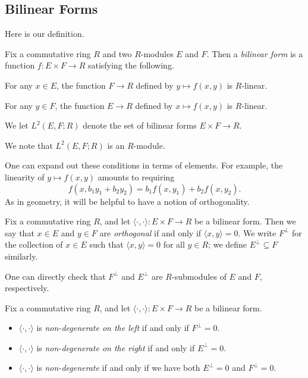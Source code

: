 \documentclass[../notes.tex]{subfiles}
\begin{document}
\subsection{Bilinear Forms}
Here is our definition.
\begin{definition}[bilinear]
	Fix a commutative ring $R$ and two $R$-modules $E$ and $F$. Then a \textit{bilinear form} is a function $f\colon E\times F\to R$ satisfying the following.
	\begin{listalph}
		\item For any $x\in E$, the function $F\to R$ defined by $y\mapsto f(x,y)$ is $R$-linear.
		\item For any $y\in F$, the function $E\to R$ defined by $x\mapsto f(x,y)$ is $R$-linear.
	\end{listalph}
	We let $L^2(E,F;R)$ denote the set of bilinear forms $E\times F\to R$.
\end{definition}
\begin{remark}
	We note that $L^2(E,F;R)$ is an $R$-module.
\end{remark}
One can expand out these conditions in terms of elements. For example, the linearity of $y\mapsto f(x,y)$ amounts to requiring
\[f(x,b_1y_1+b_2y_2)=b_1f(x,y_1)+b_2f(x,y_2).\]
As in geometry, it will be helpful to have a notion of orthogonality.
\begin{definition}[orthogonal]
	Fix a commutative ring $R$, and let $\langle\cdot,\cdot\rangle\colon E\times F\to R$ be a bilinear form. Then we say that $x\in E$ and $y\in F$ are \textit{orthogonal} if and only if $\langle x,y\rangle=0$. We write $F^\perp$ for the collection of $x\in E$ such that $\langle x,y\rangle=0$ for all $y\in R$; we define $E^\perp\subseteq F$ similarly.
\end{definition}
\begin{remark}
	One can directly check that $F^\perp$ and $E^\perp$ are $R$-submodules of $E$ and $F$, respectively.
\end{remark}
\begin{definition}
	Fix a commutative ring $R$, and let $\langle\cdot,\cdot\rangle\colon E\times F\to R$ be a bilinear form.
	\begin{itemize}
		\item $\langle\cdot,\cdot\rangle$ is \textit{non-degenerate on the left} if and only if $F^\perp=0$.
		\item $\langle\cdot,\cdot\rangle$ is \textit{non-degenerate on the right} if and only if $E^\perp=0$.
		\item $\langle\cdot,\cdot\rangle$ is \textit{non-degenerate} if and only if we have both $E^\perp=0$ and $F^\perp=0$.
	\end{itemize}
\end{definition}
\end{document}
